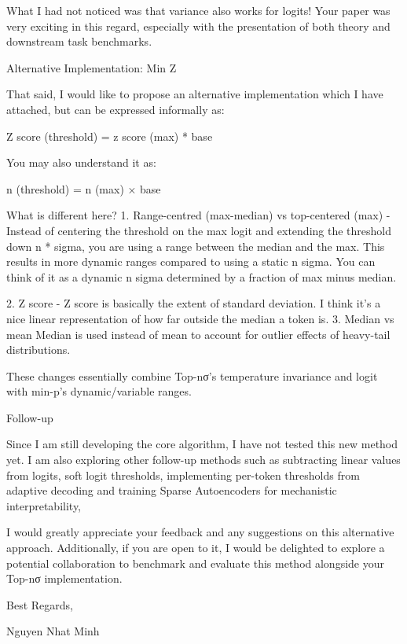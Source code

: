 \documentclass{article}
\begin{document}
What I had not noticed was that variance also works for logits! Your paper was very exciting in this regard, especially with the presentation of both theory and downstream task benchmarks.


Alternative Implementation: Min Z

That said, I would like to propose an alternative implementation which I have attached, but can be expressed informally as:


Z score (threshold) = z score (max) * base %


You may also understand it as:

n (threshold) = n (max) × base %


What is different here?
1. Range-centred (max-median) vs top-centered (max) - Instead of centering the threshold on the max logit and extending the threshold down n * sigma, you are using a range between the median and the max. This results in more dynamic ranges compared to using a static n sigma. You can think of it as a dynamic n sigma determined by a fraction of max minus median.

2. Z score - Z score is basically the extent of standard deviation. I think it’s a nice linear representation of how far outside the median a token is.
3. Median vs mean Median is used instead of mean to account for outlier effects of heavy-tail distributions.


These changes essentially combine Top-nσ’s temperature invariance and logit with min-p’s dynamic/variable ranges.


Follow-up

Since I am still developing the core algorithm, I have not tested this new method yet. I am also exploring other follow-up methods such as subtracting linear values from logits, soft logit thresholds, implementing per-token thresholds from adaptive decoding and training Sparse Autoencoders for mechanistic interpretability,


I would greatly appreciate your feedback and any suggestions on this alternative approach. Additionally, if you are open to it, I would be delighted to explore a potential collaboration to benchmark and evaluate this method alongside your Top-nσ implementation.


Best Regards,

Nguyen Nhat Minh
\end{document}
